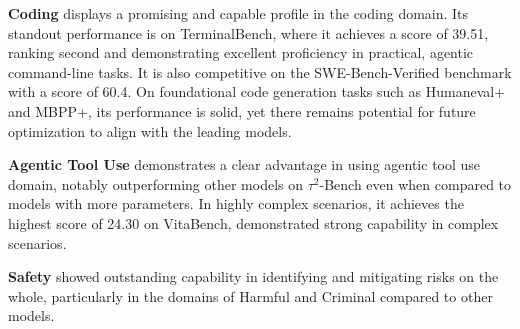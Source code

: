 \textbf{Coding}  \longcat displays a promising and capable profile in the coding domain. Its standout performance is on TerminalBench, where it achieves a score of 39.51, ranking second and demonstrating excellent proficiency in practical, agentic command-line tasks. It is also competitive on the SWE-Bench-Verified benchmark with a score of 60.4. On foundational code generation tasks such as Humaneval+ and MBPP+, its performance is solid, yet there remains potential for future optimization to align with the leading models.

\textbf{Agentic Tool Use}  \longcat demonstrates a clear advantage in using agentic tool use domain, notably outperforming other models on $\tau^2$-Bench even when compared to models with more parameters. In highly complex scenarios, it achieves the highest score of 24.30 on VitaBench, demonstrated strong capability in complex scenarios.

\textbf{Safety}  \longcat showed outstanding capability in identifying and mitigating risks on the whole, particularly in the domains of Harmful and Criminal compared to other models.


